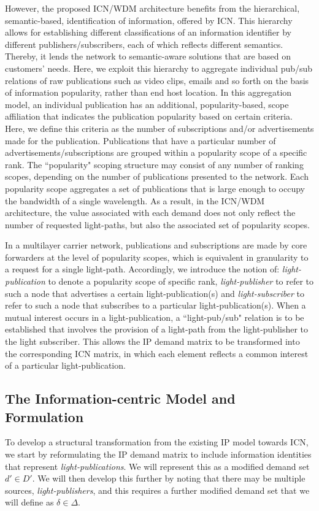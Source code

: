 \documentclass[journal]{IEEEtran}
\begin{document}
However, the proposed ICN/WDM architecture benefits from the hierarchical, semantic-based, identification of information, offered by ICN. This hierarchy allows for establishing different classifications of an information identifier by different publishers/subscribers, each of which reflects different semantics. Thereby, it lends the network to semantic-aware solutions that are based on customers' needs. 
Here, we exploit this hierarchy to aggregate individual pub/sub relations of raw publications such as video clips, emails and so forth on the basis of information popularity, rather than end host location.
In this aggregation model, an individual publication has an additional, popularity-based, scope affiliation that indicates the publication popularity based on certain criteria. Here, we define this criteria as the number of subscriptions and/or advertisements made for the publication. Publications that have a particular number of advertisements/subscriptions are grouped within a popularity scope of a specific rank. The ``popularity" scoping structure may consist of any number of ranking scopes, depending on the number of publications presented to the network. Each popularity scope aggregates a set of publications that is large enough to occupy the bandwidth of a single wavelength. As a result, in the ICN/WDM architecture, the value associated with each demand does not only reflect the number of requested light-paths, but also the associated set of popularity scopes.

In a multilayer carrier network, publications and subscriptions are made by core forwarders at the level of popularity scopes, which is equivalent in granularity to a request for a single light-path. Accordingly, we introduce the notion of: \emph{light-publication} to denote a popularity scope of specific rank, \emph{light-publisher} to refer to such a node that advertises a certain light-publication(s) and \emph{light-subscriber} to refer to such a node that subscribes to a particular light-publication(s). When a mutual interest occurs in a light-publication, a ``light-pub/sub" relation is to be established that involves the provision of a light-path from the light-publisher to the light subscriber.
This allows the IP demand matrix to be transformed into the corresponding ICN matrix, in which each element reflects a common interest of a particular light-publication.

 \subsection{The Information-centric Model and Formulation}\label{sec:icnmodel} 
To develop a structural transformation from the existing IP model
towards ICN, we start by reformulating the IP demand matrix to include
information identities that represent \emph{light-publications}. We
will represent this as a modified demand set $d' \in D'$. We will then develop
this further by noting that there may be multiple sources,
\emph{light-publishers}, and this requires a further modified demand
set that we will define as $\delta \in \Delta$.
\end{document}
